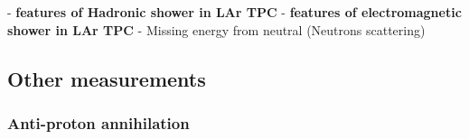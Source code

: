 - {\bf features of Hadronic shower in LAr TPC}
- {\bf features of electromagnetic shower in LAr TPC}
- Missing energy from neutral (Neutrons scattering)
% 
%

\subsection{Other measurements} 
\subsubsection{Anti-proton annihilation }

